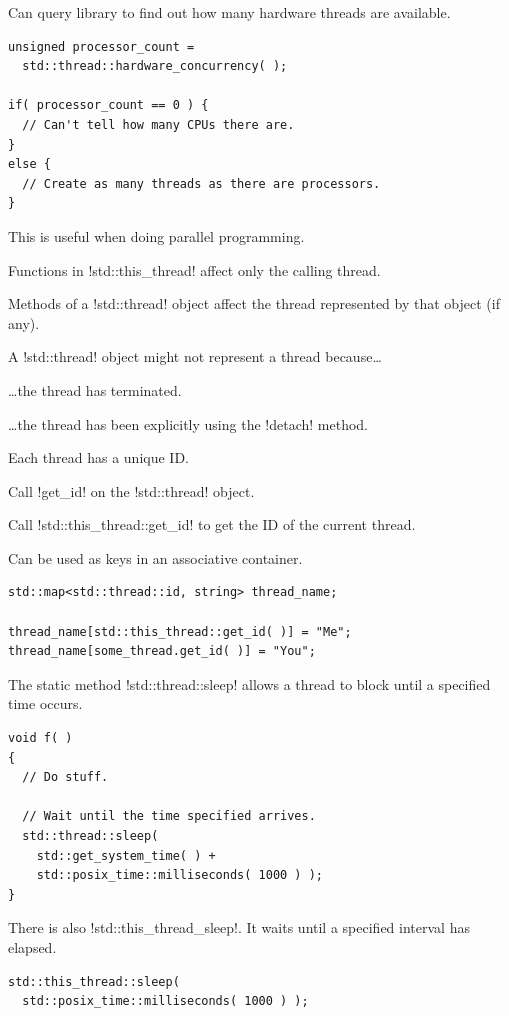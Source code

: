 \documentclass[landscape]{slides}
\begin{document}

Can query library to find out how many hardware threads are available.
\vspace{5mm}
{\small
\begin{lstlisting}
unsigned processor_count =
  std::thread::hardware_concurrency( );

if( processor_count == 0 ) {
  // Can't tell how many CPUs there are.
}
else {
  // Create as many threads as there are processors.
}
\end{lstlisting}
}
This is useful when doing parallel programming.
\stopslide


Functions in !std::this_thread! affect only the calling thread.

Methods of a !std::thread! object affect the thread represented by that object (if any).

A !std::thread! object might not represent a thread because\ldots
\begin{citemize}
  \item \ldots the thread has terminated.
  \item \ldots the thread has been explicitly  using the !detach! method.
\end{citemize}
\stopslide


Each thread has a unique ID.
\begin{citemize}
  \item Call !get_id! on the !std::thread! object.
  \item Call !std::this_thread::get_id! to get the ID of the current thread.
\end{citemize}

Can be used as keys in an associative container.
\vspace{5mm}
{\small
\begin{lstlisting}
std::map<std::thread::id, string> thread_name;

thread_name[std::this_thread::get_id( )] = "Me";
thread_name[some_thread.get_id( )] = "You";
\end{lstlisting}
}
\stopslide

The static method !std::thread::sleep! allows a thread to block until a specified time occurs.
\vspace{5mm}
{\small
\begin{lstlisting}
void f( )
{
  // Do stuff.

  // Wait until the time specified arrives.
  std::thread::sleep(
    std::get_system_time( ) +
    std::posix_time::milliseconds( 1000 ) );
}
\end{lstlisting}
}
There is also !std::this_thread_sleep!. It waits until a specified interval has elapsed.
\vspace{5mm}
{\small
\begin{lstlisting}
std::this_thread::sleep(
  std::posix_time::milliseconds( 1000 ) );
\end{lstlisting}
}
\stopslide
\end{document}
